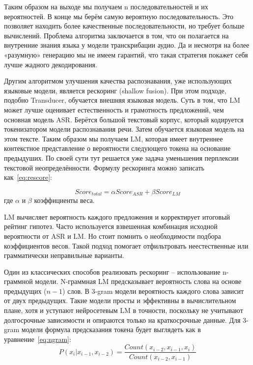 Таким образом на выходе мы получаем n последовательностей и их вероятностей.
В конце мы берём самую вероятную последовательность.
Это позволяет находить более качественные последовательности, но требует больше вычислений.
Проблема алгоритма заключается в том, что он полагается на внутренние знания языка у модели транскрибации аудио.
Да и несмотря на более «разумную» генерацию мы не имеем гарантий, что такая стратегия покажет себя лучше жадного декодирования.

Другим алгоритмом улучшения качества распознавания, уже использующих языковые модели, является рескоринг (shallow fusion)\cite{toshniwal2018comparison}.
При этом подходе, подобно Transducer, обучается внешняя языковая модель.
Суть в том, что LM может лучше оценивает естественность и грамотность предложений, чем основная модель ASR.
Берётся большой текстовый корпус, который кодируется токенизатором модели распознавания речи.
Затем обучается языковая модель на этом тексте.
Таким образом мы получаем LM, которая имеет внутреннее контекстное представление о вероятности следующего токена на основание предыдуших.
По своей сути тут решается уже задача уменьшения перплексии текстовой неопределённости.
Формулу рескоринга можно записать как~\ref{eq:rescore}:

\begin{equation}
  Score_{total} = \alpha Score_{ASR} + \beta Score_{LM}
  \label{eq:rescore}
\end{equation}
где $\alpha$ и $\beta$ коэффициенты веса.

LM вычисляет вероятность каждого предложения и корректирует итоговый рейтинг гипотез.
Часто используется взвешенная комбинация исходной вероятности от ASR и LM.
Но стоит помнить о необходимости подбора коэффициентов весов.
Такой подход помогает отфильтровать неестественные или грамматически неправильные варианты.

Один из классических способов реализовать рескоринг -- использование n-граммной модели.
N-граммная LM предсказывает вероятность слова на основе предыдущих ($n-1$) слов.
В 3-gram модели вероятность каждого слова зависит от двух предыдущих.
Такие модели просты и эффективны в вычислительном плане, хотя и уступают нейросетевым LM в точности, поскольку не учитывают долгосрочные зависимости и опираются только на краткосрочные данные.
Для 3-gram модели формула предсказания токена будет выглядеть как в уравнение~\ref{eq:ngram}:
\begin{equation}
  P(x_i|x_{i-1},x_{i-2}) = \frac{Count(x_{i-2}, x_{i-1}, x_{i})}{Count(x_{i-2}, x_{i-1})}
  \label{eq:ngram}
\end{equation}


